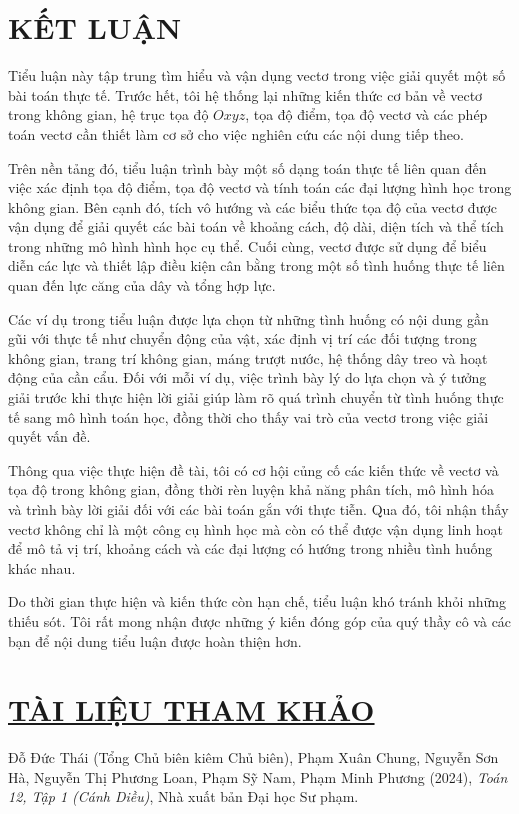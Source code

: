 \documentclass[12pt,a4paper,oneside]{book}
\theoremstyle{theorem}
\theoremstyle{definition}
\begin{document}
    \chapter*{KẾT LUẬN}


        Tiểu luận này tập trung tìm hiểu và vận dụng vectơ trong việc giải quyết một số bài toán thực tế. Trước hết, tôi hệ thống lại những kiến thức cơ bản về vectơ trong không gian, hệ trục tọa độ $Oxyz$, tọa độ điểm, tọa độ vectơ và các phép toán vectơ cần thiết làm cơ sở cho việc nghiên cứu các nội dung tiếp theo.
        
        Trên nền tảng đó, tiểu luận trình bày một số dạng toán thực tế liên quan đến việc xác định tọa độ điểm, tọa độ vectơ và tính toán các đại lượng hình học trong không gian. Bên cạnh đó, tích vô hướng và các biểu thức tọa độ của vectơ được vận dụng để giải quyết các bài toán về khoảng cách, độ dài, diện tích và thể tích trong những mô hình hình học cụ thể. Cuối cùng, vectơ được sử dụng để biểu diễn các lực và thiết lập điều kiện cân bằng trong một số tình huống thực tế liên quan đến lực căng của dây và tổng hợp lực.
        
        Các ví dụ trong tiểu luận được lựa chọn từ những tình huống có nội dung gần gũi với thực tế như chuyển động của vật, xác định vị trí các đối tượng trong không gian, trang trí không gian, máng trượt nước, hệ thống dây treo và hoạt động của cần cẩu. Đối với mỗi ví dụ, việc trình bày lý do lựa chọn và ý tưởng giải trước khi thực hiện lời giải giúp làm rõ quá trình chuyển từ tình huống thực tế sang mô hình toán học, đồng thời cho thấy vai trò của vectơ trong việc giải quyết vấn đề.
        
        Thông qua việc thực hiện đề tài, tôi có cơ hội củng cố các kiến thức về vectơ và tọa độ trong không gian, đồng thời rèn luyện khả năng phân tích, mô hình hóa và trình bày lời giải đối với các bài toán gắn với thực tiễn. Qua đó, tôi nhận thấy vectơ không chỉ là một công cụ hình học mà còn có thể được vận dụng linh hoạt để mô tả vị trí, khoảng cách và các đại lượng có hướng trong nhiều tình huống khác nhau.
        
        Do thời gian thực hiện và kiến thức còn hạn chế, tiểu luận khó tránh khỏi những thiếu sót. Tôi rất mong nhận được những ý kiến đóng góp của quý thầy cô và các bạn để nội dung tiểu luận được hoàn thiện hơn.



    \chapter*{\underline{TÀI LIỆU THAM KHẢO}}
    \noindent [1] Đỗ Đức Thái (Tổng Chủ biên kiêm Chủ biên), Phạm Xuân Chung, Nguyễn Sơn Hà, Nguyễn Thị Phương Loan, Phạm Sỹ Nam, Phạm Minh Phương (2024), \textit{Toán 12, Tập 1 (Cánh Diều)}, Nhà xuất bản Đại học Sư phạm.
\end{document}
